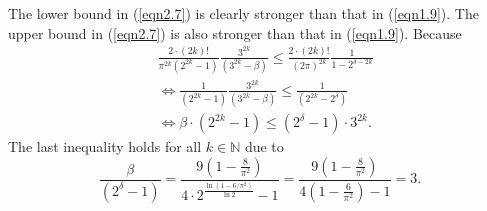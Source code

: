 \documentclass[eqnumis, pdf]{yjb}
\begin{document}
\begin{remark}\label{remI}
 The lower bound in (\ref{eqn2.7}) is clearly stronger than that in (\ref{eqn1.9}). The upper bound in (\ref{eqn2.7}) is also stronger than that in (\ref{eqn1.9}). Because
 \begin{align*}\nonumber
&\frac{2\cdot (2k)!}{\pi^{2k} (2^{2k}-1)}\frac{3^{2k}}{(3^{2k}-\beta)} \leq \frac{2 \cdot (2k)!}{(2\pi)^{2k}} \frac{1}{1-2^{\delta - 2k}} \\
&\Longleftrightarrow \frac{1}{(2^{2k}-1)}\frac{3^{2k}}{(3^{2k}-\beta)} \leq \frac{1}{(2^{2k}-2^\delta)} \\
&\Longleftrightarrow \beta \cdot (2^{2k}-1) \leq (2^\delta - 1) \cdot 3^{2k}.
 \end{align*}
 The last inequality holds for all $ k \in \mathbb{N} $ due to 
 $$ \frac{\beta}{(2^\delta - 1)} = \frac{9\left(1-\frac{8}{\pi^2}\right)}{4 \cdot 2^{\frac{\ln (1-6/\pi^2)}{\ln 2}}-1} = \frac{9\left(1-\frac{8}{\pi^2}\right)}{4\left(1-\frac{6}{\pi^2}\right)-1} = 3.$$
\end{remark}
\end{document}
